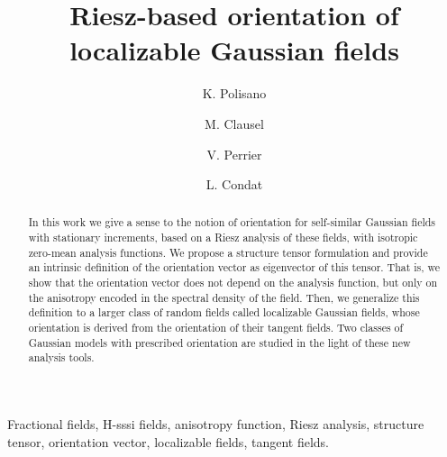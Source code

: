 \documentclass{elsarticle}
\begin{document}
\title{Riesz-based orientation of localizable Gaussian fields}

\author[ljk]{K. Polisano}

\author[ljk]{M. Clausel}

\author[ljk]{V. Perrier}

\author[gipsa]{L. Condat}



\address[ljk]{Univ. Grenoble Alpes, CNRS, Grenoble INP, LJK, 38000 Grenoble, France}
\address[gipsa]{Univ. Grenoble Alpes, CNRS, GIPSA-lab, 38000 Grenoble France}



\begin{abstract}
In this work we give a sense to the notion of orientation for self-similar Gaussian fields with stationary increments, based on a Riesz analysis of these fields, with isotropic zero-mean analysis functions. We propose a structure tensor formulation and provide an intrinsic definition of the orientation vector as eigenvector of this tensor. That is, we show that the orientation vector does not depend on the analysis function, but only on the anisotropy encoded in the spectral density of the field. Then, we generalize this definition to a larger class of random fields called localizable Gaussian fields, whose orientation is derived from the orientation of their tangent fields. Two classes of Gaussian models with prescribed orientation are studied in the light of these new analysis tools.
\end{abstract}

\begin{keyword}
Fractional fields, H-sssi fields,  anisotropy function, Riesz analysis, structure tensor, orientation vector, localizable fields, tangent fields. 
\end{keyword}


\maketitle
\end{document}
